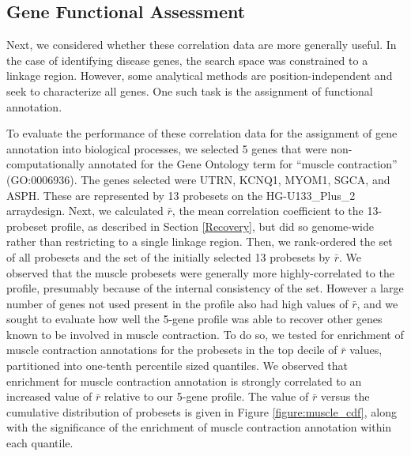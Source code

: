 \documentclass{bioinfo}
\begin{document}


\subsection{Gene Functional Assessment}

Next, we considered whether these correlation data are more generally useful.
In the case of identifying disease genes, the search space was constrained to a
linkage region.  However, some analytical methods are position-independent and
seek to characterize all genes.  One such task is the assignment of functional
annotation.

To evaluate the performance of these correlation data for the assignment of
gene annotation into biological processes, we selected 5 genes that were
non-computationally annotated for the Gene Ontology term for ``muscle
contraction'' (GO:0006936).  The genes selected were UTRN, KCNQ1, MYOM1, SGCA,
and ASPH.  These are represented by 13 probesets on the HG-U133\_Plus\_2
arraydesign.  Next, we calculated $\bar{r}$, the mean correlation coefficient
to the 13-probeset profile, as described in Section \ref{Recovery}, but did so
genome-wide rather than restricting to a single linkage region.  Then, we
rank-ordered the set of all probesets and the set of the initially selected 13
probesets by $\bar{r}$.  We observed that the muscle probesets were generally
more highly-correlated to the profile, presumably because of the internal
consistency of the set.  However a large number of genes not used present in
the profile also had high values of $\bar{r}$, and we sought to evaluate how
well the 5-gene profile was able to recover other genes known to be involved in
muscle contraction.  To do so, we tested for enrichment of muscle contraction
annotations for the probesets in the top decile of $\bar{r}$ values,
partitioned into one-tenth percentile sized quantiles.  We observed that
enrichment for muscle contraction annotation is strongly correlated to an
increased value of $\bar{r}$ relative to our 5-gene profile.  The value of
$\bar{r}$ versus the cumulative distribution of probesets is given in Figure
\ref{figure:muscle_cdf}, along with the significance of the enrichment of muscle
contraction annotation within each quantile.
\end{document}
